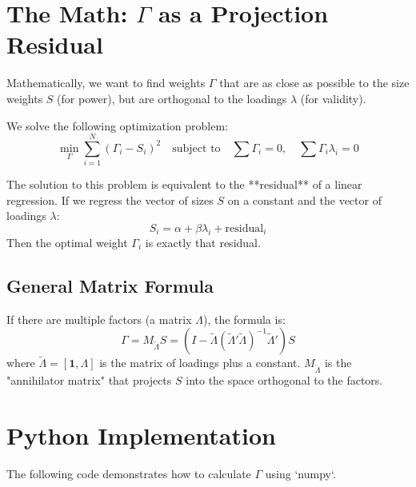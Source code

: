 \documentclass[11pt]{article}
\begin{document}
\section{The Math: $\Gamma$ as a Projection Residual}

Mathematically, we want to find weights $\Gamma$ that are as close as possible to the size weights $S$ (for power), but are orthogonal to the loadings $\lambda$ (for validity).

We solve the following optimization problem:
\begin{equation}
\min_{\Gamma} \sum_{i=1}^N (\Gamma_i - S_i)^2 \quad \text{subject to} \quad \sum \Gamma_i = 0, \quad \sum \Gamma_i \lambda_i = 0
\end{equation}

The solution to this problem is equivalent to the **residual** of a linear regression. If we regress the vector of sizes $S$ on a constant and the vector of loadings $\lambda$:
\begin{equation}
S_i = \alpha + \beta \lambda_i + \text{residual}_i
\end{equation}
Then the optimal weight $\Gamma_i$ is exactly that residual. 

\subsection{General Matrix Formula}
If there are multiple factors (a matrix $\Lambda$), the formula is:
\begin{equation}
\Gamma = M_{\tilde{\Lambda}} S = (I - \tilde{\Lambda} (\tilde{\Lambda}' \tilde{\Lambda})^{-1} \tilde{\Lambda}') S
\end{equation}
where $\tilde{\Lambda} = [\mathbf{1}, \Lambda]$ is the matrix of loadings plus a constant. $M_{\tilde{\Lambda}}$ is the "annihilator matrix" that projects $S$ into the space orthogonal to the factors.

\section{Python Implementation}

The following code demonstrates how to calculate $\Gamma$ using `numpy`.
\end{document}

